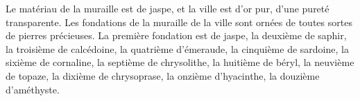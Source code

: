 Le matériau de la muraille est de jaspe,
	et la ville est d’or pur, d’une pureté transparente.
Les fondations de la muraille de la ville
	sont ornées de toutes sortes de pierres précieuses.
La première fondation est de jaspe, la deuxième de saphir,
	la troisième de calcédoine, la quatrième d’émeraude,
	la cinquième de sardoine, la sixième de cornaline,
	la septième de chrysolithe, la huitième de béryl,
	la neuvième de topaze, la dixième de chrysoprase,
	la onzième d’hyacinthe, la douzième d’améthyste.
